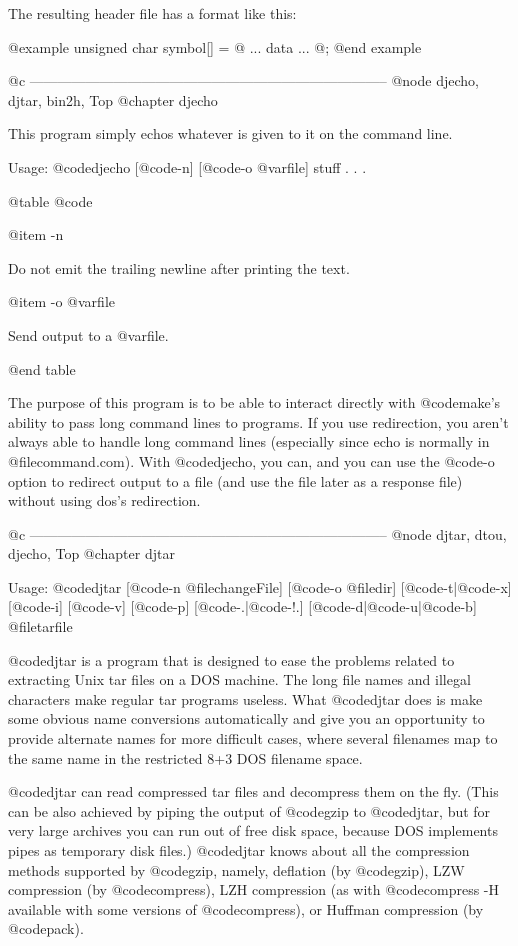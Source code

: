 The resulting header file has a format like this:

@example
unsigned char symbol[] = @{
  ... data ...
@};
@end example

@c -----------------------------------------------------------------------------
@node djecho, djtar, bin2h, Top
@chapter djecho

This program simply echos whatever is given to it on the command line.

Usage: @code{djecho} [@code{-n}] [@code{-o} @var{file}] stuff . . .

@table @code

@item -n

Do not emit the trailing newline after printing the text.

@item -o @var{file}

Send output to a @var{file}.

@end table

The purpose of this program is to be able to interact directly with
@code{make}'s ability to pass long command lines to programs.  If you
use redirection, you aren't always able to handle long command lines
(especially since echo is normally in @file{command.com}).  With
@code{djecho}, you can, and you can use the @code{-o} option to redirect
output to a file (and use the file later as a response file) without
using dos's redirection.

@c -----------------------------------------------------------------------------
@node djtar, dtou, djecho, Top
@chapter djtar

Usage: @code{djtar} [@code{-n} @file{changeFile}] [@code{-o} @file{dir}]
[@code{-t}|@code{-x}] [@code{-i}] [@code{-v}] [@code{-p}]
[@code{-.}|@code{-!.}] [@code{-d}|@code{-u}|@code{-b}] @file{tarfile}

@code{djtar} is a program that is designed to ease the problems related
to extracting Unix tar files on a DOS machine.  The long file names and
illegal characters make regular tar programs useless.  What @code{djtar}
does is make some obvious name conversions automatically and give you an
opportunity to provide alternate names for more difficult cases, where
several filenames map to the same name in the restricted 8+3 DOS filename
space.

@code{djtar} can read compressed tar files and decompress them on the
fly.  (This can be also achieved by piping the output of @code{gzip} to
@code{djtar}, but for very large archives you can run out of free disk
space, because DOS implements pipes as temporary disk files.)
@code{djtar} knows about all the compression methods supported by
@code{gzip}, namely, deflation (by @code{gzip}), LZW compression
(by @code{compress}), LZH compression (as with @code{compress -H}
available with some versions of @code{compress}), or Huffman compression
(by @code{pack}).

